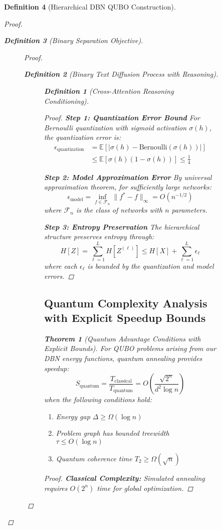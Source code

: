 \documentclass{article}
\newtheorem{theorem}{Theorem}
\newtheorem{definition}{Definition}
\begin{document}
\begin{definition}[Hierarchical DBN QUBO Construction]
\begin{proof}
\begin{definition}[Binary Separation Objective]
\begin{figure}[H]
\begin{proof}
\begin{definition}[Binary Text Diffusion Process with Reasoning]
\begin{figure}[H]
\begin{definition}[Cross-Attention Reasoning Conditioning]
\begin{proof}
\textbf{Step 1: Quantization Error Bound}
For Bernoulli quantization with sigmoid activation $\sigma(h)$, the quantization error is:
\begin{align}
\epsilon_{\text{quantization}} &= \mathbb{E}[|\sigma(h) - \text{Bernoulli}(\sigma(h))|]\\
&\leq \mathbb{E}[\sigma(h)(1-\sigma(h))] \leq \frac{1}{4}
\end{align}

\textbf{Step 2: Model Approximation Error}
By universal approximation theorem, for sufficiently large networks:
\begin{equation}
\epsilon_{\text{model}} = \inf_{f \in \mathcal{F}_n} \|f^* - f\|_{\infty} = O(n^{-1/2})
\end{equation}
where $\mathcal{F}_n$ is the class of networks with $n$ parameters.

\textbf{Step 3: Entropy Preservation}
The hierarchical structure preserves entropy through:
\begin{equation}
H[Z] = \sum_{\ell=1}^L H[Z^{(\ell)}] \leq H[X] + \sum_{\ell=1}^L \epsilon_{\ell}
\end{equation}
where each $\epsilon_{\ell}$ is bounded by the quantization and model errors.
\end{proof}

\subsection{Quantum Complexity Analysis with Explicit Speedup Bounds}

\begin{theorem}[Quantum Advantage Conditions with Explicit Bounds]
For QUBO problems arising from our DBN energy functions, quantum annealing provides speedup:
\begin{equation}
S_{\text{quantum}} = \frac{T_{\text{classical}}}{T_{\text{quantum}}} = O\left(\frac{\sqrt{2^n}}{d^2 \log n}\right)
\end{equation}
when the following conditions hold:
\begin{enumerate}
\item Energy gap $\Delta \geq \Omega(\log n)$
\item Problem graph has bounded treewidth $\tau \leq O(\log n)$
\item Quantum coherence time $T_2 \geq \Omega(\sqrt{n})$
\end{enumerate}
\end{theorem}

\begin{proof}
\textbf{Classical Complexity:} Simulated annealing requires $O(2^n)$ time for global optimization.


\end{proof}
\end{definition}
\end{figure}
\end{definition}
\end{proof}
\end{figure}
\end{definition}
\end{proof}
\end{definition}
\end{document}
